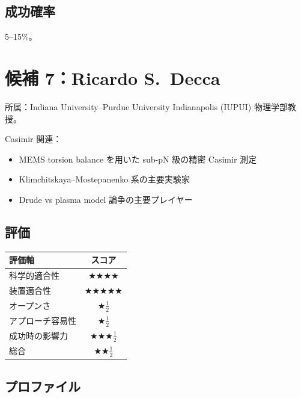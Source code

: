 \documentclass[11pt,a4paper]{article}
\def\textbf#1{#1}%
\begin{document}
\subsection{成功確率}

\textbf{5--15\%}。

\newpage

\section{候補 7：Ricardo S.\ Decca}

\begin{candidatebox}
\textbf{所属}：Indiana University--Purdue University Indianapolis (IUPUI)
物理学部教授。

\textbf{Casimir 関連}：
\begin{itemize}
\item MEMS torsion balance を用いた sub-pN 級の精密 Casimir 測定
\item Klimchitskaya--Mostepanenko 系の主要実験家
\item Drude vs plasma model 論争の主要プレイヤー
\end{itemize}
\end{candidatebox}

\subsection{評価}

\begin{center}
\begin{tabular}{lc}
\toprule
評価軸 & スコア \\
\midrule
科学的適合性    & ★★★★ \\
装置適合性      & ★★★★★ \\
オープンさ      & ★$\frac{1}{2}$ \\
アプローチ容易性 & ★$\frac{1}{2}$ \\
成功時の影響力  & ★★★$\frac{1}{2}$ \\
\midrule
\textbf{総合}   & \textbf{★★$\frac{1}{2}$} \\
\bottomrule
\end{tabular}
\end{center}

\subsection{プロファイル}
\end{document}
